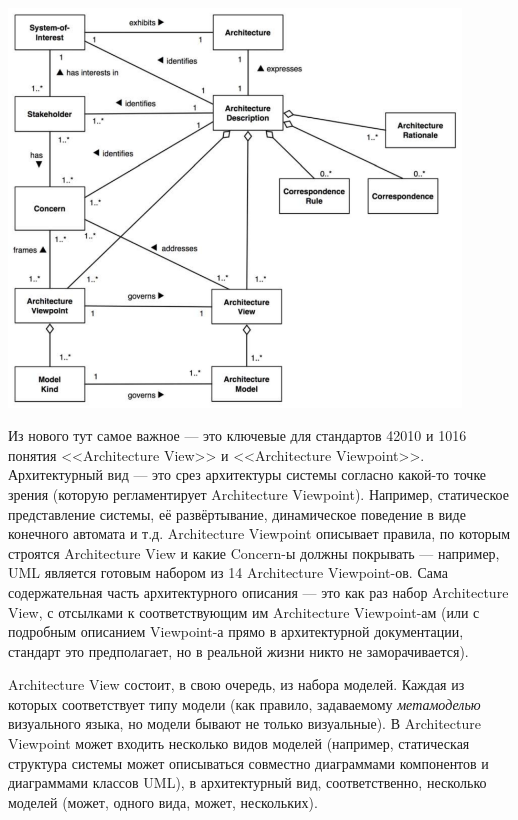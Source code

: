 \documentclass[a5paper]{article}
\begin{document}
\begin{center}
    \includegraphics[width=0.9\textwidth]{ieee42010ArchitectureDescription.png}
\end{center}

Из нового тут самое важное --- это ключевые для стандартов 42010 и 1016 понятия <<Architecture View>> и <<Architecture Viewpoint>>. Архитектурный вид --- это срез архитектуры системы согласно какой-то точке зрения (которую регламентирует Architecture Viewpoint). Например, статическое представление системы, её развёртывание, динамическое поведение в виде конечного автомата и т.д. Architecture Viewpoint описывает правила, по которым строятся Architecture View и какие Concern-ы должны покрывать --- например, UML является готовым набором из 14 Architecture Viewpoint-ов. Сама содержательная часть архитектурного описания --- это как раз набор Architecture View, с отсылками к соответствующим им Architecture Viewpoint-ам (или с подробным описанием Viewpoint-а прямо в архитектурной документации, стандарт это предполагает, но в реальной жизни никто не заморачивается).

Architecture View состоит, в свою очередь, из набора моделей. Каждая из которых соответствует типу модели (как правило, задаваемому \emph{метамоделью} визуального языка, но модели бывают не только визуальные). В Architecture Viewpoint может входить несколько видов моделей (например, статическая структура системы может описываться совместно диаграммами компонентов и диаграммами классов UML), в архитектурный вид, соответственно, несколько моделей (может, одного вида, может, нескольких). 
\end{document}
